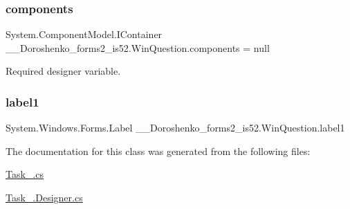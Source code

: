 \hypertarget{class__7___doroshenko__forms2__is52_1_1_win_question_ad8b2952aae1000f120f3aaa8ab63697f}{}\label{class__7___doroshenko__forms2__is52_1_1_win_question_ad8b2952aae1000f120f3aaa8ab63697f} 
\subsubsection{\texorpdfstring{components}{components}}
{\footnotesize\ttfamily System.\+Component\+Model.\+I\+Container \+\_\+\_\+\+Doroshenko\+\_\+forms2\+\_\+is52.\+Win\+Question.\+components = null\hspace{0.3cm}{\ttfamily [private]}}



Required designer variable. 

\hypertarget{class__7___doroshenko__forms2__is52_1_1_win_question_ac84f9387bd3683c5a3ac30ff987eaba1}{}\label{class__7___doroshenko__forms2__is52_1_1_win_question_ac84f9387bd3683c5a3ac30ff987eaba1} 
\subsubsection{\texorpdfstring{label1}{label1}}
{\footnotesize\ttfamily System.\+Windows.\+Forms.\+Label \+\_\+\_\+\+Doroshenko\+\_\+forms2\+\_\+is52.\+Win\+Question.\+label1\hspace{0.3cm}{\ttfamily [private]}}



The documentation for this class was generated from the following files\+:\begin{DoxyCompactItemize}
\item 
\hyperlink{_task__1_8cs}{Task\+\_.\+cs}\item 
\hyperlink{_task__1_8_designer_8cs}{Task\+\_.\+Designer.\+cs}\end{DoxyCompactItemize}
